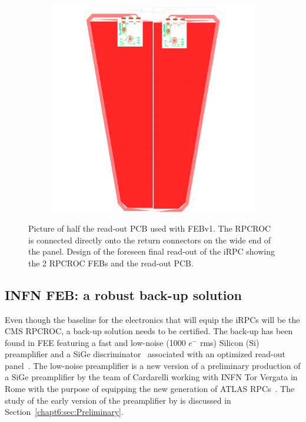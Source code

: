 \begin{figure}[H]
\begin{subfigure}{0.6\linewidth}
			\includegraphics[width = \linewidth]{fig/chapt6/iRPC-RPCROC-Final.png}
			\caption{\label{fig:RPCROC_FEB:B}}
		\end{subfigure}
		\caption{\label{fig:RPCROC_FEB}  Picture of half the read-out PCB used with FEBv1. The RPCROC is connected directly onto the return connectors on the wide end of the panel.  Design of the foreseen final read-out of the iRPC showing the 2 RPCROC FEBs and the read-out PCB.}
	\end{figure}

	\subsection{INFN FEB: a robust back-up solution}
	\label{chapt6:ssec:INFN}
	
	Even though the baseline for the electronics that will equip the iRPCs will be the CMS RPCROC, a back-up solution needs to be certified. The back-up has been found in \acl{FEE} featuring a fast and low-noise (1000 $e^-$ rms) Silicon (Si) preamplifier and a SiGe discriminator~\cite{PIZZIMENTO2018} associated with an optimized read-out panel~\cite{ALUNNOCAMELIA2018}. The low-noise preamplifier is a new version of a preliminary production of a SiGe preamplifier by the team of Cardarelli working with INFN Tor Vergata in Rome with the purpose of equipping the new generation of ATLAS RPCs~\cite{CARDARELLI2013}. The study of the early version of the preamplifier by is discussed in Section~\ref{chapt6:sec:Preliminary}.
	 

